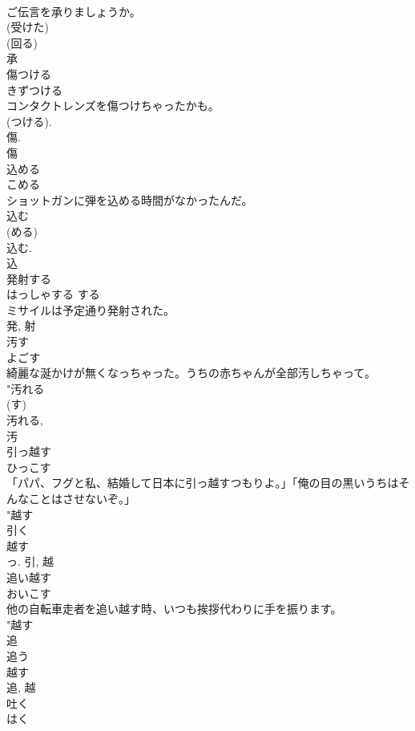 \documentclass[8pt]{extreport}
\begin{document}
\begin{CJK}{UTF8}{min}
\\	ご伝言を承りましょうか。	
\\	(受けた) 
\\	(回る) 
\\	承	
\\	傷つける	
\\	きずつける	
\\	コンタクトレンズを傷つけちゃったかも。	
\\	(つける). 
\\	傷. 
\\	傷	
\\	込める	
\\	こめる	
\\	ショットガンに弾を込める時間がなかったんだ。	
\\	込む 
\\	(める) 
\\	込む. 
\\	込	
\\	発射する	
\\	はっしゃする	する 
\\	ミサイルは予定通り発射された。	
\\	発, 射	
\\	汚す	
\\	よごす	
\\	綺麗な涎かけが無くなっちゃった。うちの赤ちゃんが全部汚しちゃって。	
\\	"汚れる 
\\	(す) 
\\	汚れる, 
\\	汚	
\\	引っ越す	
\\	ひっこす	
\\	「パパ、フグと私、結婚して日本に引っ越すつもりよ。」「俺の目の黒いうちはそんなことはさせないぞ。」	
\\	"越す 
\\	引く 
\\	越す 
\\	っ.	引, 越	
\\	追い越す	
\\	おいこす	
\\	他の自転車走者を追い越す時、いつも挨拶代わりに手を振ります。	
\\	"越す 
\\	追 
\\	追う 
\\	越す 
\\	追, 越	
\\	吐く	
\\	はく	

\end{CJK}
\end{document}
